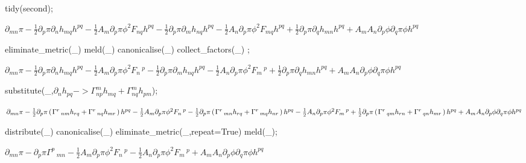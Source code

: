 \documentclass[10pt]{article}
\newcommand\brwrap[3]{%
  \setbox0=\hbox{$#2$}
  \left#1\vbox to \the\ht0{\hbox to 0pt{}}\right.\kern-.2em
  \begingroup #2\endgroup\kern-.15em
  \left.\vbox to \the\ht0{\hbox to 0pt{}}\right#3
}
\begin{document}
\begin{python}
tidy(second);
\end{python}
\begin{adjustwidth}{1em}{0cm}${}\partial_{m n}{\pi} - \frac{1}{2}\partial_{p}{\pi} \partial_{n}{h_{m q}} h^{p q} - \frac{1}{2}A_{m} \partial_{p}{\pi} {\phi}^{2} F_{n q} h^{p q} - \frac{1}{2}\partial_{p}{\pi} \partial_{m}{h_{n q}} h^{p q} - \frac{1}{2}A_{n} \partial_{p}{\pi} {\phi}^{2} F_{m q} h^{p q}+\frac{1}{2}\partial_{p}{\pi} \partial_{q}{h_{m n}} h^{p q}+A_{m} A_{n} \partial_{p}{\phi} \partial_{q}{\pi} \phi h^{p q}$\end{adjustwidth}
\begin{python}
eliminate_metric(_)
meld(_)
canonicalise(_)
collect_factors(_)
;
\end{python}
\begin{adjustwidth}{1em}{0cm}${}\partial_{m n}{\pi} - \frac{1}{2}\partial_{p}{\pi} \partial_{n}{h_{m q}} h^{p q} - \frac{1}{2}A_{m} \partial_{p}{\pi} {\phi}^{2} F_{n}\,^{p} - \frac{1}{2}\partial_{p}{\pi} \partial_{m}{h_{n q}} h^{p q} - \frac{1}{2}A_{n} \partial_{p}{\pi} {\phi}^{2} F_{m}\,^{p}+\frac{1}{2}\partial_{p}{\pi} \partial_{q}{h_{m n}} h^{p q}+A_{m} A_{n} \partial_{p}{\phi} \partial_{q}{\pi} \phi h^{p q}$\end{adjustwidth}
\begin{python}
substitute(_,$\partial_{n}{h_{p q}}-> \Gamma^{m}_{n p} h_{m q} + \Gamma^{m}_{n q} h_{p m}$);
\end{python}
\begin{adjustwidth}{1em}{0cm}${}\partial_{m n}{\pi} - \frac{1}{2}\partial_{p}{\pi} \brwrap{(}{\Gamma^{r}\,_{n m} h_{r q}+\Gamma^{r}\,_{n q} h_{m r}}{)} h^{p q} - \frac{1}{2}A_{m} \partial_{p}{\pi} {\phi}^{2} F_{n}\,^{p} - \frac{1}{2}\partial_{p}{\pi} \brwrap{(}{\Gamma^{r}\,_{m n} h_{r q}+\Gamma^{r}\,_{m q} h_{n r}}{)} h^{p q} - \frac{1}{2}A_{n} \partial_{p}{\pi} {\phi}^{2} F_{m}\,^{p}+\frac{1}{2}\partial_{p}{\pi} \brwrap{(}{\Gamma^{r}\,_{q m} h_{r n}+\Gamma^{r}\,_{q n} h_{m r}}{)} h^{p q}+A_{m} A_{n} \partial_{p}{\phi} \partial_{q}{\pi} \phi h^{p q}$\end{adjustwidth}
\begin{python}
distribute(_)
canonicalise(_)
eliminate_metric(_,repeat=True)
meld(_);
\end{python}
\begin{adjustwidth}{1em}{0cm}${}\partial_{m n}{\pi}-\partial_{p}{\pi} \Gamma^{p}\,_{m n} - \frac{1}{2}A_{m} \partial_{p}{\pi} {\phi}^{2} F_{n}\,^{p} - \frac{1}{2}A_{n} \partial_{p}{\pi} {\phi}^{2} F_{m}\,^{p}+A_{m} A_{n} \partial_{p}{\phi} \partial_{q}{\pi} \phi h^{p q}$\end{adjustwidth}
\end{document}
